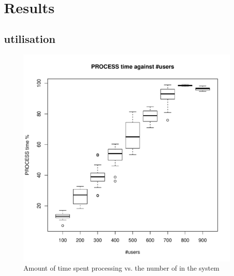 \section{Results}
\label{sec:results}

\subsection{\Dc utilisation}
\begin{figure}[tb]
	\centering
	\includegraphics[width=\linewidth]{PROCESS.pdf} 
	\caption{Amount of time spent processing vs. the number of \ues in the system}
	\label{fig:process}
\end{figure}

